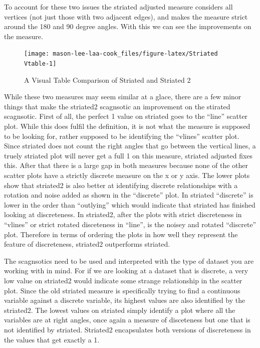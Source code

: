 To account for these two issues the striated adjusted measure considers
all vertices (not just those with two adjacent edges), and makes the
measure strict around the 180 and 90 degree angles. With this we can see
the improvements on the measure.

\begin{Schunk}
\begin{figure}
\texttt{[image: mason-lee-laa-cook\_files/figure-latex/Striated Vtable-1]} \caption[A Visual Table Comparison of Striated and Striated 2]{A Visual Table Comparison of Striated and Striated 2}\label{fig:Striated Vtable}
\end{figure}
\end{Schunk}

While these two measures may seem similar at a glace, there are a few
minor things that make the striated2 scagnsotic an improvement on the
stirated scagnsotic. First of all, the perfect 1 value on striated goes
to the ``line'' scatter plot. While this does fulfil the definition, it
is not what the measure is supposed to be looking for, rather supposed
to be identifying the ``vlines'' scatter plot. Since striated does not
count the right angles that go between the vertical lines, a truely
striated plot will never get a full 1 on this measure, striated adjusted
fixes this. After that there is a large gap in both measures because
none of the other scatter plots have a strictly discrete measure on the
x or y axis. The lower plots show that striated2 is also better at
identifying discrete relationships with a rotation and noise added as
shown in the ``discrete'' plot. In striated ``discrete'' is lower in the
order than ``outlying'' which would indicate that striated has finished
looking at discreteness. In striated2, after the plots with strict
discreteness in ``vlines'' or strict rotated disceteness in ``line'', is
the noisey and rotated ``discrete'' plot. Therefore in terms of ordering
the plots in how well they represent the feature of discreteness,
striated2 outperforms striated.

The scagnsotics need to be used and interpreted with the type of dataset
you are working with in mind. For if we are looking at a dataset that is
discrete, a very low value on striated2 would indicate some strange
relationship in the scatter plot. Since the old striated measure is
specifically trying to find a continuous variable against a discrete
variable, its highest values are also identified by the striated2. The
lowest values on striated simply identify a plot where all the variables
are at right angles, once again a measure of disceteness but one that is
not identified by striated. Striated2 encapsulates both versions of
discreteness in the values that get exactly a 1.

